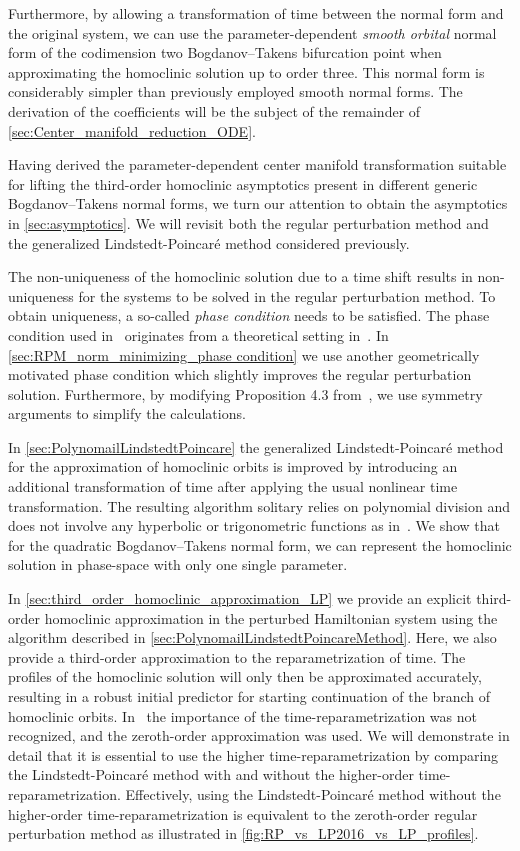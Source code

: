 Furthermore, by
allowing a transformation of time between the normal form and the original
system, we can use the parameter-dependent \emph{smooth orbital} normal form of
the codimension two Bogdanov--Takens bifurcation point when approximating the
homoclinic solution up to order three. This normal form is considerably simpler
than previously employed smooth normal forms. The derivation of the
coefficients will be the subject of the remainder of
\cref{sec:Center_manifold_reduction_ODE}.

Having derived the parameter-dependent center manifold transformation suitable for
lifting the third-order homoclinic asymptotics present in different generic
Bogdanov--Takens normal forms, we turn our attention to obtain the asymptotics
in \cref{sec:asymptotics}. We will revisit both the regular perturbation method and
the generalized Lindstedt-Poincar\'e method considered previously.

The non-uniqueness of the homoclinic solution due to a time shift results in
non-uniqueness for the systems to be solved in the regular perturbation method.
To obtain uniqueness, a so-called \emph{phase condition} needs to be satisfied.
The phase condition used in~\cite{Kuznetsov2014improved} originates from a
theoretical setting in~\cite{Beyn_1994}. In \cref{sec:RPM_norm_minimizing_phase
condition} we use another geometrically motivated phase condition which slightly
improves the regular perturbation solution. Furthermore, by modifying
Proposition 4.3 from~\cite{Beyn_1994}, we use symmetry arguments to simplify
the calculations.

In \cref{sec:PolynomailLindstedtPoincare} the generalized Lindstedt-Poincar\'e
method for the approximation of homoclinic orbits is improved by introducing an
additional transformation of time after applying the usual nonlinear time
transformation. The resulting algorithm solitary relies on polynomial division
and does not involve any hyperbolic or trigonometric functions as
in~\cite{Algaba_2019,Al-Hdaibat2016}. We show that for the quadratic Bogdanov--Takens
normal form, we can represent the homoclinic solution in phase-space with
only one single parameter.

In \cref{sec:third_order_homoclinic_approximation_LP} we provide an explicit
third-order homoclinic approximation in the perturbed Hamiltonian system using
the algorithm described in \cref{sec:PolynomailLindstedtPoincareMethod}. Here, we also
provide a third-order approximation to the reparametrization of time. The
profiles of the homoclinic solution will only then be approximated accurately,
resulting in a robust initial predictor for starting continuation of the branch
of homoclinic orbits.  In~\cite{Al-Hdaibat2016} the importance of the
time-reparametrization was not recognized, and the zeroth-order approximation
was used. We will demonstrate in detail that it is essential to use the higher
time-reparametrization by comparing the Lindstedt-Poincar\'e method with and
without the higher-order time-reparametrization.  Effectively, using the
Lindstedt-Poincar\'e method without the higher-order time-reparametrization is
equivalent to the zeroth-order regular perturbation method as illustrated in
\cref{fig:RP_vs_LP2016_vs_LP_profiles}.

